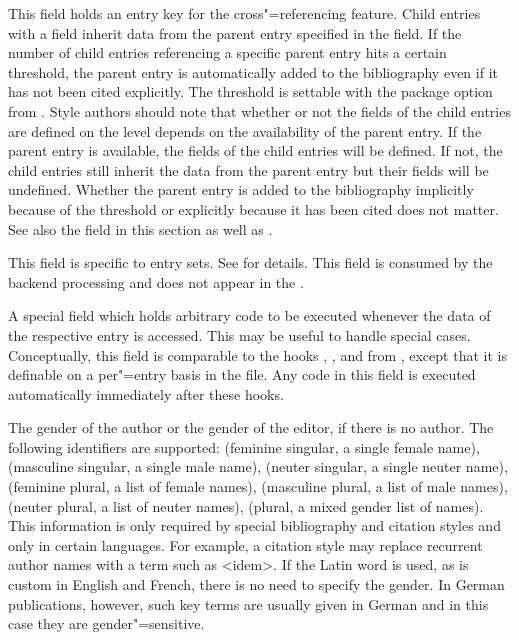 \documentclass{ltxdockit}[2011/03/25]
\begin{document}
\begin{fieldlist}


This field holds an entry key for the cross"=referencing feature. Child entries with a  field inherit data from the parent entry specified in the  field. If the number of child entries referencing a specific parent entry hits a certain threshold, the parent entry is automatically added to the bibliography even if it has not been cited explicitly. The threshold is settable with the  package option from . Style authors should note that whether or not the  fields of the child entries are defined on the  level depends on the availability of the parent entry. If the parent entry is available, the  fields of the child entries will be defined. If not, the child entries still inherit the data from the parent entry but their  fields will be undefined. Whether the parent entry is added to the bibliography implicitly because of the threshold or explicitly because it has been cited does not matter. See also the  field in this section as well as .


This field is specific to entry sets. See  for details. This field is consumed by the backend processing and does not appear in the .


A special field which holds arbitrary \tex code to be executed whenever the data of the respective entry is accessed. This may be useful to handle special cases. Conceptually, this field is comparable to the hooks , , and  from , except that it is definable on a per"=entry basis in the  file. Any code in this field is executed automatically immediately after these hooks.


The gender of the author or the gender of the editor, if there is no author. The following identifiers are supported:  (feminine singular, a single female name),  (masculine singular, a single male name),  (neuter singular, a single neuter name),  (feminine plural, a list of female names),  (masculine plural, a list of male names),  (neuter plural, a list of neuter names),  (plural, a mixed gender list of names). This information is only required by special bibliography and citation styles and only in certain languages. For example, a citation style may replace recurrent author names with a term such as <idem>. If the Latin word is used, as is custom in English and French, there is no need to specify the gender. In German publications, however, such key terms are usually given in German and in this case they are gender"=sensitive.


\end{fieldlist}
\end{document}
